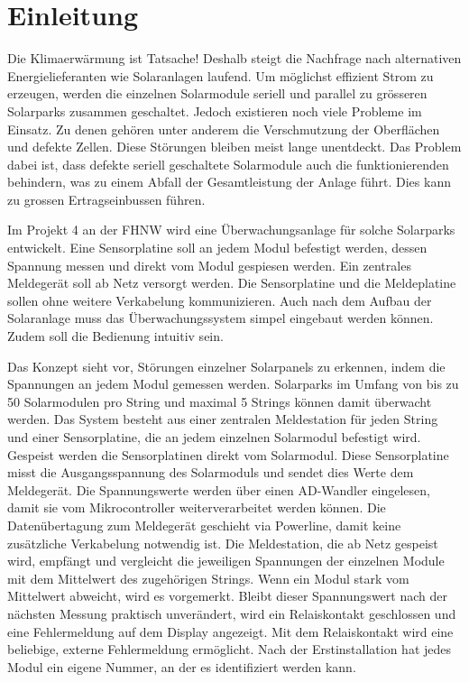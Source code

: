 \section{Einleitung}


Die Klimaerwärmung ist Tatsache! Deshalb steigt die Nachfrage nach alternativen Energielieferanten wie Solaranlagen laufend. Um möglichst effizient Strom zu erzeugen, werden die einzelnen Solarmodule seriell und parallel zu grösseren Solarparks zusammen geschaltet. Jedoch existieren noch viele Probleme im Einsatz. Zu denen gehören unter anderem die Verschmutzung der Oberflächen und defekte Zellen. Diese Störungen bleiben meist lange unentdeckt. Das Problem dabei ist, dass defekte seriell geschaltete Solarmodule auch die funktionierenden behindern, was zu einem Abfall der Gesamtleistung der Anlage führt. Dies kann zu grossen Ertragseinbussen führen.


Im Projekt 4 an der FHNW wird eine Überwachungsanlage für solche Solarparks entwickelt. Eine Sensorplatine soll an jedem Modul befestigt werden, dessen Spannung messen und direkt vom Modul gespiesen werden. Ein zentrales Meldegerät soll ab Netz versorgt werden. Die Sensorplatine und die Meldeplatine sollen ohne weitere Verkabelung kommunizieren. Auch nach dem Aufbau der Solaranlage muss das Überwachungssystem simpel eingebaut werden können. Zudem soll die Bedienung intuitiv sein.

Das Konzept sieht vor, Störungen einzelner Solarpanels zu erkennen, indem die Spannungen an jedem Modul gemessen werden. Solarparks im Umfang von bis zu 50 Solarmodulen pro String und maximal 5 Strings können damit überwacht werden. Das System besteht aus einer zentralen Meldestation für jeden String und einer Sensorplatine, die an jedem einzelnen Solarmodul befestigt wird. Gespeist werden die Sensorplatinen direkt vom Solarmodul. Diese Sensorplatine misst die Ausgangsspannung des Solarmoduls und sendet dies Werte dem Meldegerät. Die Spannungswerte werden über einen AD-Wandler eingelesen, damit sie vom Mikrocontroller weiterverarbeitet werden können. Die Datenübertagung zum Meldegerät geschieht via Powerline, damit keine zusätzliche Verkabelung notwendig ist. Die Meldestation, die ab Netz gespeist wird, empfängt und vergleicht die jeweiligen Spannungen der einzelnen Module mit dem Mittelwert des zugehörigen Strings. Wenn ein Modul stark vom Mittelwert abweicht, wird es vorgemerkt. Bleibt dieser Spannungswert nach der nächsten Messung praktisch unverändert, wird ein Relaiskontakt geschlossen und eine Fehlermeldung auf dem Display angezeigt. Mit dem Relaiskontakt wird eine beliebige, externe Fehlermeldung ermöglicht. Nach der Erstinstallation hat jedes Modul ein eigene Nummer, an der es identifiziert werden kann.
